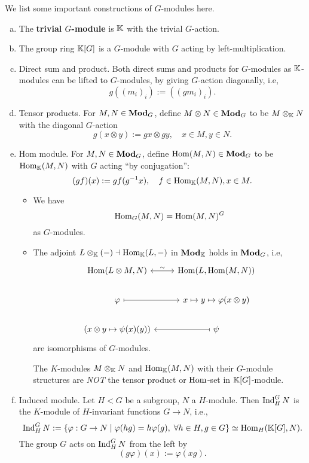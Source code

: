 \begin{example}
We list some important constructions of $G$-modules here.
\begin{enumerate}[(a)]
    \item The \textbf{trivial $G$-module} is $\mathbb{K}$ with the trivial $G$-action.
    \item The group ring $\mathbb{K}[G]$ is a $G$-module with $G$ acting by left-multiplication.
    \item Direct sum and product. Both direct sums and products for $G$-modules as $\mathbb{K}$-modules can be lifted to $G$-modules, by giving $G$-action diagonally, i.e, \[g((m_i)_i) := \left( (gm_i)_i \right).\]
    \item Tensor products. For $M, N\in \mathbf{Mod}_G$, define $M\otimes N\in \mathbf{Mod}_G$ to be $M\otimes_{\mathbb{K}} N$ with the diagonal $G$-action \[g(x\otimes y) := gx\otimes gy,\quad x\in M, y\in N.\]
    \item Hom module. For $M, N\in\mathbf{Mod}_G$, define $\mathop{\mathrm{Hom}}(M, N)\in \mathbf{Mod}_G$ to be $\mathop{\mathrm{Hom}}_{\mathbb{K}}(M, N)$ with $G$ acting ``by conjugation'': \[(gf)(x) := g f(g^{-1}x),\quad f\in\operatorname{Hom}_{\mathbb{K}}(M, N), x\in M.\]
    \begin{itemize}
        \item We have \[\operatorname{Hom}_G(M, N) = \operatorname{Hom}(M, N)^G\] as $G$-modules.
        \item The adjoint $L\otimes_{\mathbb{K}} (-) \dashv \operatorname{Hom}_{\mathbb{K}}(L, -)$ in $\mathbf{Mod}_{\mathbb{K}}$ holds in $\mathbf{Mod}_G$, i.e,
\[\begin{tikzcd}
	{\Hom(L\otimes M,N)} & {\Hom(L, \Hom(M, N))} \\
	\varphi & {x\mapsto y\mapsto\varphi(x\otimes y)} \\
	{\left( x\otimes y\mapsto \psi(x)(y) \right)} & \psi
	\arrow["\sim", leftrightarrow, from=1-1, to=1-2]
	\arrow[maps to, from=2-1, to=2-2]
	\arrow[maps to, from=3-2, to=3-1]
\end{tikzcd}\]
    are isomorphisms of $G$-modules.
    \begin{remark}
        The $K$-modules $M\otimes_{\mathbb{K}} N$ and $\mathop{\mathrm{Hom}}_{\mathbb{K}}(M, N)$ with their $G$-module structures are \textit{NOT} the tensor product or $\operatorname{Hom}$-set in $\mathbb{K}[G]$-module.
    \end{remark}
    \end{itemize}
    \item Induced module. Let $H < G$ be a subgroup, $N$ a $H$-module. Then $\operatorname{Ind}_H^G N$ is the $K$-module of $H$-invariant functions $G\to N$, i.e., \[\operatorname{Ind}_H^G N := \{\varphi : G \to N\mid \varphi(hg) = h\varphi(g),\;\forall h\in H, g\in G\}\simeq\operatorname{Hom}_H(\mathbb{K}[G], N).\]
    The group $G$ acts on $\operatorname{Ind}_H^G N$ from the left by \[(g\varphi)(x) := \varphi(xg).\]

\end{enumerate}
\end{example}
